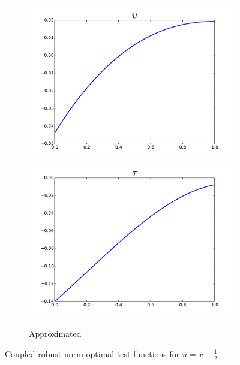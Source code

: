 \documentclass{article}
\begin{document}
\begin{figure}[ht]
\begin{subfigure}[t]{0.4\textwidth}
\includegraphics[width=\textwidth]{OptimalTestFunctions/RobustApprox3_v}\\
\includegraphics[width=\textwidth]{OptimalTestFunctions/RobustApprox3_tau}\\
\caption{Approximated}
\label{fig:approxRobust}
\end{subfigure}
\caption{Coupled robust norm optimal test functions for $u=x-\frac{1}{2}$}
\label{fig:optimalRobust}
\end{figure}
\end{document}
